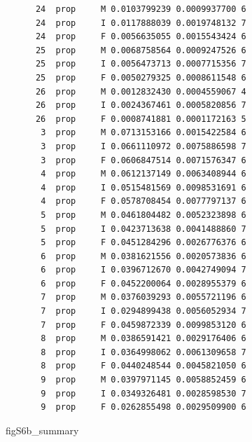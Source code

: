 \documentclass[
  landscape]{article}
\newenvironment{Shaded}{\begin{snugshade}}{\end{snugshade}}
\newcommand{\NormalTok}[1]{#1}
\begin{document}
\begin{verbatim}
      24  prop     M 0.0103799239 0.0009937700 6
      24  prop     I 0.0117888039 0.0019748132 7
      24  prop     F 0.0056635055 0.0015543424 6
      25  prop     M 0.0068758564 0.0009247526 6
      25  prop     I 0.0056473713 0.0007715356 7
      25  prop     F 0.0050279325 0.0008611548 6
      26  prop     M 0.0012832430 0.0004559067 4
      26  prop     I 0.0024367461 0.0005820856 7
      26  prop     F 0.0008741881 0.0001172163 5
       3  prop     M 0.0713153166 0.0015422584 6
       3  prop     I 0.0661110972 0.0075886598 7
       3  prop     F 0.0606847514 0.0071576347 6
       4  prop     M 0.0612137149 0.0063408944 6
       4  prop     I 0.0515481569 0.0098531691 6
       4  prop     F 0.0578708454 0.0077797137 6
       5  prop     M 0.0461804482 0.0052323898 6
       5  prop     I 0.0423713638 0.0041488860 7
       5  prop     F 0.0451284296 0.0026776376 6
       6  prop     M 0.0381621556 0.0020573836 6
       6  prop     I 0.0396712670 0.0042749094 7
       6  prop     F 0.0452200064 0.0028955379 6
       7  prop     M 0.0376039293 0.0055721196 6
       7  prop     I 0.0294899438 0.0056052934 7
       7  prop     F 0.0459872339 0.0099853120 6
       8  prop     M 0.0386591421 0.0029176406 6
       8  prop     I 0.0364998062 0.0061309658 7
       8  prop     F 0.0440248544 0.0045821050 6
       9  prop     M 0.0397971145 0.0058852459 6
       9  prop     I 0.0349326481 0.0028598530 7
       9  prop     F 0.0262855498 0.0029509900 6
\end{verbatim}

\begin{Shaded}
\begin{Highlighting}[]
\NormalTok{figS6b\_summary}
\end{Highlighting}
\end{Shaded}
\end{document}
